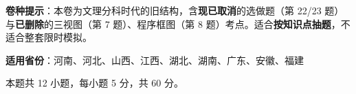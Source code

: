 

\begin{gknotice}
\textbf{ 卷种提示}：本卷为文理分科时代的旧结构，含\textbf{现已取消}的选做题（第 22/23 题）与\textbf{已删除}的三视图（第 7 题）、程序框图（第 8 题）考点。适合\textbf{按知识点抽题}，不适合整套限时模拟。

\textbf{适用省份}：河南、河北、山西、江西、湖北、湖南、广东、安徽、福建
\end{gknotice}

\par\medskip


\begin{gktip}
本题共 12 小题，每小题 5 分，共 60 分。
\end{gktip}


